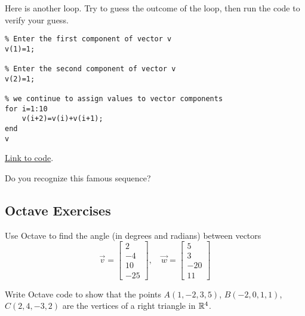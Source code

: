 \documentclass{ximera}
\begin{document}
\begin{example}\label{ex:loop2}
    Here is another loop.  Try to guess the outcome of the loop, then run the code to verify your guess.

    \begin{verbatim}
% Enter the first component of vector v
v(1)=1;

% Enter the second component of vector v
v(2)=1;

% we continue to assign values to vector components
for i=1:10
    v(i+2)=v(i)+v(i+1);
end
v
    \end{verbatim}

\href{https://sagecell.sagemath.org/?z=eJxTVXBJTcvMS1UoS00uyS9SKOPlKrONNrTWNbLWNY215uXi5VJVcMvMS1EoyUgF4syiFIXk_NyC_LzUvBKF_DSQhirbMg1jTQAoTxXV&lang=octave&interacts=eJyLjgUAARUAuQ==}{Link to code}.   

Do you recognize this famous sequence?
\end{example}

\subsection*{Octave Exercises}

\begin{problem}\label{prob_oct_vec_2}
    Use Octave to find the angle (in degrees and radians) between vectors 
    $$\vec{v}=\begin{bmatrix}2\\-4\\10\\-25\end{bmatrix},\quad\vec{w}=\begin{bmatrix}5\\3\\-20\\11\end{bmatrix}$$
\end{problem}

\begin{problem}\label{prob_oct_vec_3}
Write Octave code to show that the points $A(1, -2, 3, 5)$, $B(-2, 0, 1, 1)$, $C(2, 4, -3, 2)$ are the vertices of a right triangle in $\mathbb{R}^4$.
\end{problem}
\end{document}
